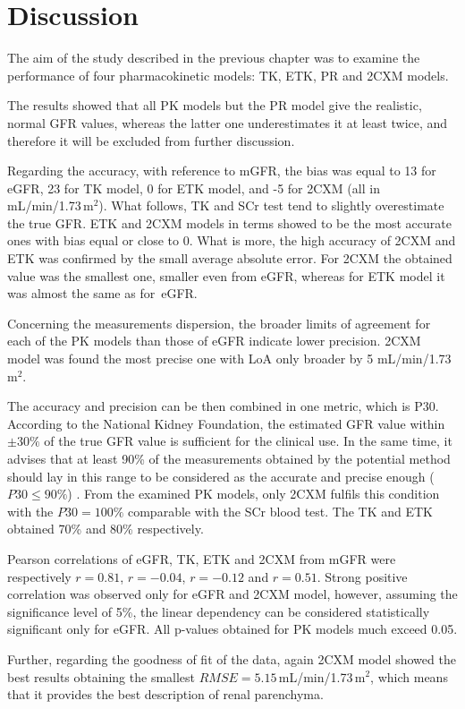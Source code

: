 \chapter{Discussion}
The aim of the study described in the previous chapter was to examine the performance of four pharmacokinetic models: TK, ETK, PR and 2CXM models.   

The results showed that all PK models but the PR model give the realistic, normal GFR values, whereas the latter one underestimates it at least twice, and therefore it will be excluded from further discussion. 

Regarding the accuracy, with reference to mGFR, the bias was equal to 13 for eGFR, 23 for TK model, 0 for ETK model, and -5 for 2CXM (all in mL/min/1.73\,m$^2$). What follows, TK and SCr test tend to slightly overestimate the true GFR. 
ETK and 2CXM models in terms showed to be the most accurate ones with bias equal or close to 0. 
What is more, the high accuracy of 2CXM and ETK was confirmed by the small average absolute error. For 2CXM the obtained value was the smallest one, smaller even from eGFR, whereas for ETK model it was almost the same as for~eGFR.

Concerning the measurements dispersion, the broader limits of agreement for each of the PK models than those of eGFR indicate lower precision. 2CXM model was found the most precise one with LoA only broader by 5 mL/min/1.73\,m$^2$.     

The accuracy and precision can be then combined in one metric, which is P30.  
According to the National Kidney Foundation, the estimated GFR value within $\pm30\%$ of the true GFR value is sufficient for the clinical use. In the same time, it advises that at least 90\% of the measurements obtained by the potential method should lay in this range to be considered as the accurate and precise enough ($P30\leqslant90\%$) \cite{levey2003national}. From the examined PK models, only 2CXM fulfils this condition with the $P30=100\%$ comparable with  the SCr blood test. The TK and ETK obtained 70\% and 80\% respectively.   

Pearson correlations of eGFR, TK, ETK and 2CXM from mGFR were respectively $r=0.81$, $r=-0.04$, $r=-0.12$ and $r=0.51$. Strong positive correlation was observed only for eGFR and 2CXM model, however, assuming the significance level of 5\%, the linear dependency can be considered statistically significant only for eGFR. All p-values obtained for PK models much exceed 0.05.  

Further, regarding the goodness of fit of the data, again 2CXM model showed the best results obtaining the smallest $RMSE=5.15$\,mL/min/1.73\,m$^2$, which means that it provides the best description of renal parenchyma.  

